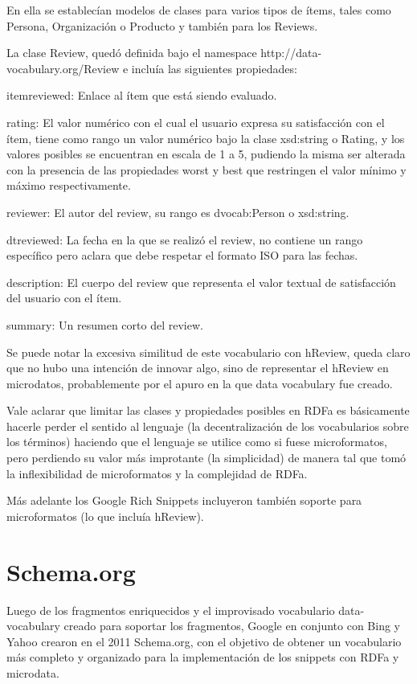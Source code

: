 En ella se establecían modelos de clases para varios tipos de ítems, tales como Persona, Organización o Producto y también para los Reviews.

La clase Review, quedó definida bajo el namespace http://data-vocabulary.org/Review e incluía las siguientes propiedades:

itemreviewed: Enlace al ítem que está siendo evaluado.

rating: El valor numérico con el cual el usuario expresa su satisfacción con el ítem, tiene como rango un valor numérico bajo la clase 
xsd:string o Rating, y los valores posibles se encuentran en escala de 1 a 5, pudiendo la misma ser alterada con la presencia de las 
propiedades worst y best que restringen el valor mínimo y máximo respectivamente.

reviewer: El autor del review, su rango es dvocab:Person o xsd:string.

dtreviewed: La fecha en la que se realizó el review, no contiene un rango específico pero aclara que debe respetar el formato 
ISO para las fechas.

description: El cuerpo del review que representa el valor textual de satisfacción del usuario con el ítem.

summary: Un resumen corto del review.

Se puede notar la excesiva similitud de este vocabulario con hReview, queda claro que no hubo una intención de innovar algo, 
sino de representar el hReview en microdatos, probablemente por el apuro en la que data vocabulary fue creado.

Vale aclarar que limitar las clases y propiedades posibles en RDFa es básicamente hacerle perder el sentido al lenguaje 
(la decentralización de los vocabularios sobre los términos) haciendo que el lenguaje se utilice como si fuese microformatos, 
pero perdiendo su valor más improtante (la simplicidad) de manera tal que tomó la inflexibilidad de microformatos y la complejidad 
de RDFa.

Más adelante los Google Rich Snippets incluyeron también soporte para microformatos (lo que incluía hReview). 


\section{Schema.org}
\label{section:schema}

Luego de los fragmentos enriquecidos y el improvisado vocabulario data-vocabulary creado para soportar los fragmentos, Google 
en conjunto con Bing y Yahoo crearon en el 2011 Schema.org, con el objetivo de obtener un vocabulario más completo y 
organizado para la implementación de los snippets con RDFa y microdata.

